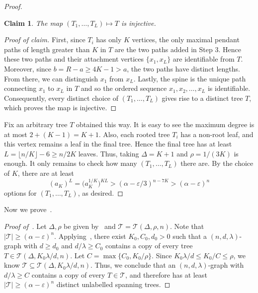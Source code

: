 \documentclass[reqno,final,a4paper]{amsart}
\numberwithin{equation}{section}
\newtheorem{claim}[theorem]{Claim}
\theoremstyle{definition}
\theoremstyle{remark}
\newcommand{\eps}{\varepsilon}
\newenvironment{proofclaim}[1][Proof of claim]{\begin{proof}[#1]\renewcommand*{\qedsymbol}{\(\blacksquare\)}}{\end{proof}}
\begin{document}
\begin{proof}
    \begin{claim}
        The map $(T_1,\dots, T_L)\mapsto T$ is injective.
    \end{claim}
    \begin{proofclaim}
        First, since $T_i$ has only $K$ vertices, the only maximal pendant paths of length greater than $K$ in $T$ are the two paths added in Step 3. Hence these two paths and their attachment vertices $\{x_1,x_L\}$ are identifiable from $T$.
        Moreover, since $b = R-a \geq 4K-1> a$, the two paths have distinct lengths. From there, we can distinguish $x_1$ from $x_L$. Lastly, the spine is the unique path connecting $x_1$ to $x_L$ in $T$ and so the ordered sequence $x_1,x_2,\dots, x_L$ is identifiable. Consequently, every distinct choice of $(T_1,\dots, T_L)$ gives rise to a distinct tree $T$, which proves the map is injective.
    \end{proofclaim}
    Fix an arbitrary tree $T$ obtained this way. It is easy to see the maximum degree is at most $2 + (K-1) = K+1$. 
    Also, each rooted tree $T_i$ has a non-root leaf, and this vertex remains a leaf in the final tree. Hence the final tree has at least $L = \lfloor n/K\rfloor - 6 \geq n/2K$ leaves. Thus, taking $\Delta = K+1$ and $\rho = 1/(3K)$ is enough. It only remains to check how many $(T_1,\dots, T_L)$ there are. 
    By the choice of $K$, there are at least 
    \[
       (a_K)^L = \bigl(a_K^{1/K}\bigr)^{KL} >(\alpha - \eps/3)^{n - 7K} > (\alpha -\eps)^n 
    \]
    options for $(T_1,\dots, T_L)$, as desired.
\end{proof}

Now we prove~.
\begin{proof}[Proof of~]
    Let $\Delta, \rho$ be given by~ and $\mathcal T = \mathcal T(\Delta, \rho, n)$. Note that $|\mathcal T|\geq (\alpha-\eps)^n$. Applying~, there exist $K_0,C_0,d_0 >0$ such that a $(n,d,\lambda)$-graph with $d\geq d_0$ and $d/\lambda \geq C_0$ contains a copy of every tree $T\in \mathcal T(\Delta, K_0\lambda/d, n)$. Let $C = \max\{C_0, K_0/\rho\}$. Since $K_0\lambda/d\leq K_0/C\leq \rho$, we know $\mathcal T\subseteq \mathcal T(\Delta, K_0\lambda /d,n)$. Thus,
    we conclude that an $(n,d,\lambda)$-graph with $d/\lambda \geq C$ contains a copy of every $T\in \mathcal T$, and therefore has at least $|\mathcal T|\geq (\alpha-\eps)^n$ distinct unlabelled spanning trees.
\end{proof}
\end{document}
